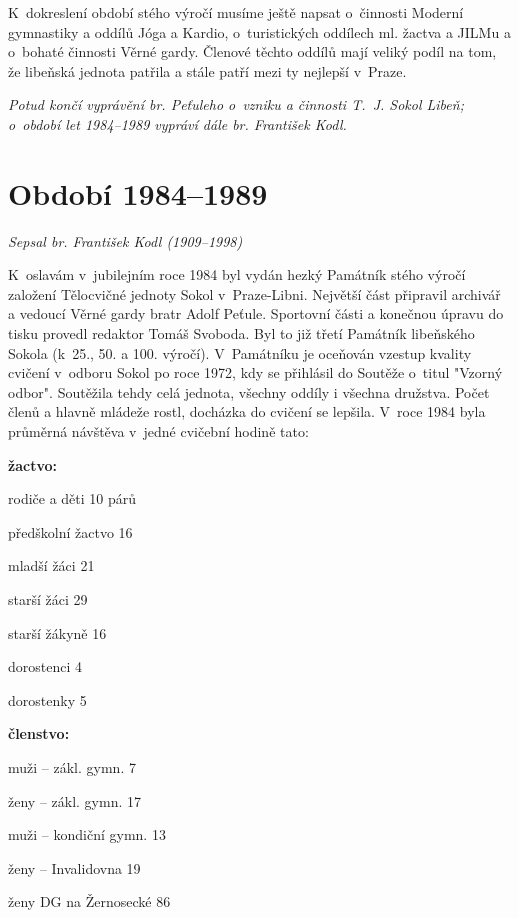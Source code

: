 \documentclass[a5paper, 11pt, twoside]{article}
\begin{document}
K~dokreslení období stého výročí musíme ještě napsat o~činnosti Moderní
gymnastiky a oddílů Jóga a Kardio, o~turistických oddílech ml. žactva a
JILMu a o~bohaté činnosti Věrné gardy. Členové těchto oddílů mají veliký
podíl na tom, že libeňská jednota patřila a stále patří mezi ty nejlepší
v~Praze.

\begin{center}
\textit{Potud končí vyprávění br. Peťuleho o~vzniku a činnosti T.~J. Sokol
Libeň; o~období let 1984--1989 vypráví dále br. František Kodl.}
\end{center}

\section{Období 1984--1989}

\begin{center}
  \textit{Sepsal br. František Kodl (1909--1998)}
\end{center}

\noindent
K~oslavám v~jubilejním roce 1984 byl vydán hezký Památník stého výročí
založení Tělocvičné jednoty Sokol v~Praze-Libni. Největší část připravil
archivář a vedoucí Věrné gardy bratr Adolf Peťule. Sportovní části a
konečnou úpravu do tisku provedl redaktor Tomáš Svoboda. Byl to již
třetí Památník libeňského Sokola (k~25., 50. a 100. výročí). V~Památníku
je oceňován vzestup kvality cvičení v~odboru Sokol po roce 1972, kdy se
přihlásil do Soutěže o~titul "Vzorný odbor". Soutěžila tehdy celá
jednota, všechny oddíly i všechna družstva. Počet členů a hlavně mládeže
rostl, docházka do cvičení se lepšila. V~roce 1984 byla průměrná
návštěva v~jedné cvičební hodině tato:

\medskip
\textbf{žactvo:}

rodiče a děti 10 párů

předškolní žactvo 16

mladší žáci 21

starší žáci 29

starší žákyně 16

dorostenci 4

dorostenky 5


\medskip
\textbf{členstvo:}

muži -- zákl. gymn. 7

ženy -- zákl. gymn. 17

muži -- kondiční gymn. 13

ženy -- Invalidovna 19

ženy DG na Žernosecké 86
\end{document}
